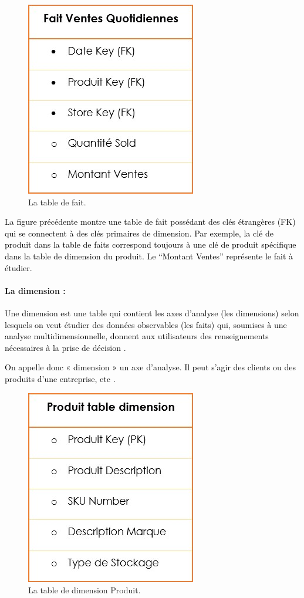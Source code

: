 \documentclass[a4paper,12pt]{report}
\begin{document}
\begin{figure}[H]
\begin{center}
\includegraphics[width=0.3\linewidth]{./images/12}
\end{center}

\caption{La table de fait.\citep{dieng13etoile} }
\label{fig:12}

\end{figure}





\textcolor{black}{La figure précédente montre une table de fait possédant des clés étrangères (FK) qui se connectent à des clés primaires de dimension. Par exemple, la clé de produit dans la table de faits correspond toujours à une clé de produit spécifique dans la table de dimension du produit. Le “Montant Ventes” représente le fait à étudier.   }

\paragraph{La dimension :}

\textcolor{black}{Une dimension est une table qui contient les axes d'analyse (les dimensions) selon lesquels on veut étudier des données observables (les faits) qui, soumises à une analyse multidimensionnelle, donnent aux utilisateurs des renseignements nécessaires à la prise de décision \citep{ballard1998data}.}

\textcolor{black}{On appelle donc « dimension » un axe d'analyse. Il peut s'agir des clients ou des produits d'une entreprise, etc \citep{ballard1998data}.}


\begin{figure}[H]
\begin{center}
\includegraphics[width=0.3\linewidth]{./images/13}
\end{center}

\caption{La table de dimension Produit.\citep{dieng13etoile} }
\label{fig:13}

\end{figure}
\end{document}
